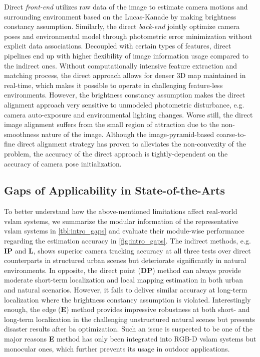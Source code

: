 Direct {\em front-end} utilizes raw data of the image to estimate camera motions and surrounding environment based on the Lucas-Kanade by making brightness constancy assumption. 
Similarly, the direct {\em back-end} jointly optimize camera poses and environmental model through photometric error minimization without explicit data associations. 
Decoupled with certain types of features, direct pipelines end up with higher flexibility of image information usage compared to the indirect ones. 
Without computationally intensive feature extraction and matching process, the direct approach allows for denser 3D map maintained in real-time, which makes it possible to operate in challenging feature-less environments.
However, the brightness constancy assumption makes the direct alignment approach very sensitive to unmodeled photometric disturbance, e.g. camera auto-exposure and environmental lighting changes.
Worse still, the direct image alignment suffers from the small region of attraction due to the non-smoothness nature of the image.
Although the image-pyramid-based coarse-to-fine direct alignment strategy has proven to alleviates the non-convexity of the problem, the accuracy of the direct approach is tightly-dependent on the accuracy of camera pose initialization.
  

\subsection{Gaps of Applicability in State-of-the-Arts}
To better understand how the above-mentioned limitations affect real-world \acrshort{vslam} systems, we summarize the modular information of the representative \acrshort{vslam} systems in \ref{tbl:intro_gaps} and evaluate their module-wise performance regarding the estimation accuracy in \ref{fig:intro_gaps}. 
The indirect methods, e.g. \textbf{IP} and \textbf{L}, shows superior camera tracking accuracy at all three tests over direct counterparts in structured urban scenes but deteriorate significantly in natural environments.  
In opposite, the direct point (\textbf{DP}) method can always provide moderate short-term localization and local mapping estimation in both urban and natural scenarios. 
However, it fails to deliver similar accuracy at long-term localization where the brightness constancy assumption is violated.  
Interestingly enough, the edge (\textbf{E}) method provides impressive robustness at both short- and long-term localization in the challenging unstructured natural scenes but presents disaster results after \acrshort{ba} optimization. 
Such an issue is suspected to be one of the major reasons \textbf{E} method has only been integrated into RGB-D \acrshort{vslam} systems but monocular ones, which further prevents its usage in outdoor applications.
 
